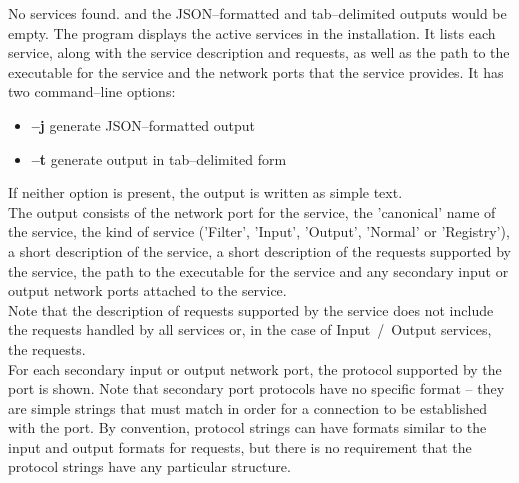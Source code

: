 \outputBegin{}
No services found.
\outputEnd{}
and the JSON--formatted and tab--delimited outputs would be empty.
The program  displays the active services in the \mplusm{}
installation.
It lists each service, along with the service description and requests, as well as the
path to the executable for the service and the \yarp{} network ports that the service
provides.
It has two command--line options:
\begin{itemize}
\item \textbf{--j} generate JSON--formatted output
\item \textbf{--t} generate output in tab--delimited form
\end{itemize}
If neither option is present, the output is written as simple text.\\

The output consists of the \yarp{} network port for the service, the 'canonical' name of
the service, the kind of service ('Filter', 'Input', 'Output', 'Normal' or 'Registry'), a
short description of the service, a short description of the requests supported by the
service, the path to the executable for the service and any secondary input or output
\yarp{} network ports attached to the service.\\

Note that the description of requests supported by the service does not include the
 requests handled by all services or, in the case of
Input~/~Output services, the 
requests.\\

For each secondary input or output \yarp{} network port, the protocol supported by the
port is shown.
Note that secondary port protocols have no specific format -- they are simple strings that
must match in order for a connection to be established with the port.
By convention, protocol strings can have formats similar to the input and output formats
for requests, but there is no requirement that the protocol strings have any particular
structure.\\

